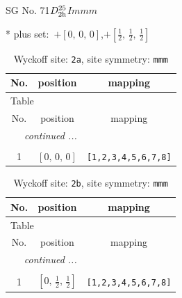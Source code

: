 \documentclass[fleqn,8pt]{jsarticle}
\begin{document}
\setcounter{MaxMatrixCols}{32}

\renewcommand{\tablename}{Table~}
\renewcommand{\figurename}{Figure~}
\begin{center}
\LARGE
SG No. 71\quad$D_{\rm 2h}^{25}$\quad$Immm$\quad[ orthorhombic ]
\end{center}
* plus set:\,\,\,$+\left[ 0,\, 0,\, 0 \right]$,\quad $+\left[ \frac{1}{2},\, \frac{1}{2},\, \frac{1}{2} \right]$
\renewcommand{\arraystretch}{1.2}
\begin{longtable}{ccc}
\caption{Wyckoff site: {\tt 2a}, site symmetry: {\tt mmm}}
 \\
 \hline \hline
No. & position & mapping \\ \hline \endfirsthead

\multicolumn{2}{l}{\tablename\ \thetable{}} \\
 \hline \hline
No. & position & mapping \\ \hline \endhead

 \hline \hline
\multicolumn{2}{r}{\footnotesize\it continued ...} \\ \endfoot

 \hline \hline
\multicolumn{2}{r}{} \\ \endlastfoot

1 & $\left[ 0,\, 0,\, 0 \right]$ & {\tt [1,2,3,4,5,6,7,8]} \\
\end{longtable}
\renewcommand{\arraystretch}{1.2}
\begin{longtable}{ccc}
\caption{Wyckoff site: {\tt 2b}, site symmetry: {\tt mmm}}
 \\
 \hline \hline
No. & position & mapping \\ \hline \endfirsthead

\multicolumn{2}{l}{\tablename\ \thetable{}} \\
 \hline \hline
No. & position & mapping \\ \hline \endhead

 \hline \hline
\multicolumn{2}{r}{\footnotesize\it continued ...} \\ \endfoot

 \hline \hline
\multicolumn{2}{r}{} \\ \endlastfoot

1 & $\left[ 0,\, \frac{1}{2},\, \frac{1}{2} \right]$ & {\tt [1,2,3,4,5,6,7,8]} \\
\end{longtable}
\renewcommand{\arraystretch}{1.2}
\end{document}
